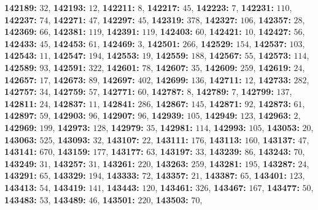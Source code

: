 \textsf{\bfseries 142189:} $32$, \textsf{\bfseries 142193:} $12$, \textsf{\bfseries 142211:} $8$, \textsf{\bfseries 142217:} $45$, \textsf{\bfseries 142223:} $7$, \textsf{\bfseries 142231:} $110$, \textsf{\bfseries 142237:} $74$, \textsf{\bfseries 142271:} $47$, \textsf{\bfseries 142297:} $45$, \textsf{\bfseries 142319:} $378$, \textsf{\bfseries 142327:} $106$, \textsf{\bfseries 142357:} $28$, \textsf{\bfseries 142369:} $66$, \textsf{\bfseries 142381:} $119$, \textsf{\bfseries 142391:} $119$, \textsf{\bfseries 142403:} $60$, \textsf{\bfseries 142421:} $10$, \textsf{\bfseries 142427:} $56$, \textsf{\bfseries 142433:} $45$, \textsf{\bfseries 142453:} $61$, \textsf{\bfseries 142469:} $3$, \textsf{\bfseries 142501:} $266$, \textsf{\bfseries 142529:} $154$, \textsf{\bfseries 142537:} $103$, \textsf{\bfseries 142543:} $11$, \textsf{\bfseries 142547:} $194$, \textsf{\bfseries 142553:} $19$, \textsf{\bfseries 142559:} $188$, \textsf{\bfseries 142567:} $55$, \textsf{\bfseries 142573:} $114$, \textsf{\bfseries 142589:} $93$, \textsf{\bfseries 142591:} $322$, \textsf{\bfseries 142601:} $78$, \textsf{\bfseries 142607:} $35$, \textsf{\bfseries 142609:} $259$, \textsf{\bfseries 142619:} $24$, \textsf{\bfseries 142657:} $17$, \textsf{\bfseries 142673:} $89$, \textsf{\bfseries 142697:} $402$, \textsf{\bfseries 142699:} $136$, \textsf{\bfseries 142711:} $12$, \textsf{\bfseries 142733:} $282$, \textsf{\bfseries 142757:} $34$, \textsf{\bfseries 142759:} $57$, \textsf{\bfseries 142771:} $60$, \textsf{\bfseries 142787:} $8$, \textsf{\bfseries 142789:} $7$, \textsf{\bfseries 142799:} $137$, \textsf{\bfseries 142811:} $24$, \textsf{\bfseries 142837:} $11$, \textsf{\bfseries 142841:} $286$, \textsf{\bfseries 142867:} $145$, \textsf{\bfseries 142871:} $92$, \textsf{\bfseries 142873:} $61$, \textsf{\bfseries 142897:} $59$, \textsf{\bfseries 142903:} $96$, \textsf{\bfseries 142907:} $96$, \textsf{\bfseries 142939:} $105$, \textsf{\bfseries 142949:} $123$, \textsf{\bfseries 142963:} $2$, \textsf{\bfseries 142969:} $199$, \textsf{\bfseries 142973:} $128$, \textsf{\bfseries 142979:} $35$, \textsf{\bfseries 142981:} $114$, \textsf{\bfseries 142993:} $105$, \textsf{\bfseries 143053:} $20$, \textsf{\bfseries 143063:} $525$, \textsf{\bfseries 143093:} $32$, \textsf{\bfseries 143107:} $22$, \textsf{\bfseries 143111:} $176$, \textsf{\bfseries 143113:} $160$, \textsf{\bfseries 143137:} $47$, \textsf{\bfseries 143141:} $670$, \textsf{\bfseries 143159:} $177$, \textsf{\bfseries 143177:} $63$, \textsf{\bfseries 143197:} $33$, \textsf{\bfseries 143239:} $86$, \textsf{\bfseries 143243:} $70$, \textsf{\bfseries 143249:} $31$, \textsf{\bfseries 143257:} $31$, \textsf{\bfseries 143261:} $220$, \textsf{\bfseries 143263:} $259$, \textsf{\bfseries 143281:} $195$, \textsf{\bfseries 143287:} $24$, \textsf{\bfseries 143291:} $65$, \textsf{\bfseries 143329:} $194$, \textsf{\bfseries 143333:} $72$, \textsf{\bfseries 143357:} $21$, \textsf{\bfseries 143387:} $65$, \textsf{\bfseries 143401:} $123$, \textsf{\bfseries 143413:} $54$, \textsf{\bfseries 143419:} $141$, \textsf{\bfseries 143443:} $120$, \textsf{\bfseries 143461:} $326$, \textsf{\bfseries 143467:} $167$, \textsf{\bfseries 143477:} $50$, \textsf{\bfseries 143483:} $53$, \textsf{\bfseries 143489:} $46$, \textsf{\bfseries 143501:} $220$, \textsf{\bfseries 143503:} $70$, 
